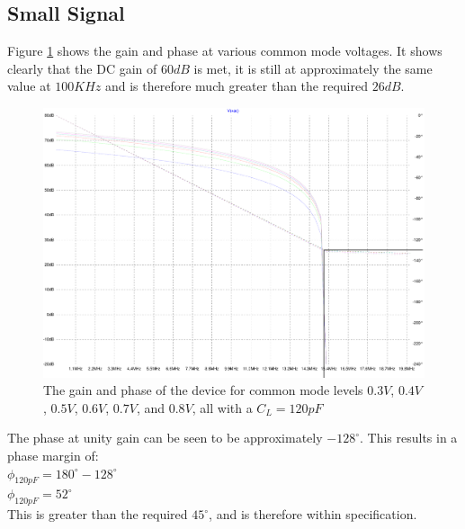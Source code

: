 \subsection{Small Signal}

Figure \ref{fig:Sac120} shows the gain and phase at various common mode voltages.
It shows clearly that the DC gain of $60dB$ is met, it is still at approximately the same value at $100KHz$ and is therefore much greater than the required $26dB$.

\begin{figure}[H]
	\centering
	\includegraphics[width=\textwidth]{./images/BasicAC-multi.pdf}
	\caption{The gain and phase of the device for common mode levels $0.3V$, $0.4V$, $0.5V$, $0.6V$, $0.7V$, and $0.8V$, all with a $C_{L} = 120pF$}
	\label{fig:Sac120}
\end{figure}

The phase at unity gain can be seen to be approximately $-128^{\circ}$.
This results in a phase margin of: \\
$\phi_{120pF} = 180^{\circ} - 128^{\circ}$ \\
$\phi_{120pF} = 52^{\circ}$ \\
This is greater than the required $45^{\circ}$, and is therefore within specification.

